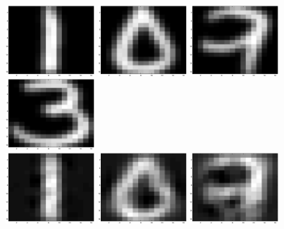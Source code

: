 \documentclass{article}
\begin{document}
\includegraphics[width=0.25\textwidth]{tes_original1.eps}\hspace{0.03\textwidth}%
\includegraphics[width=0.25\textwidth]{tes_original2.eps}\hspace{0.03\textwidth}%
\includegraphics[width=0.25\textwidth]{tes_original3.eps}\hspace{0.03\textwidth}%
\includegraphics[width=0.25\textwidth]{tes_original4.eps}\\[1em]
\includegraphics[width=0.25\textwidth]{H_tes1.eps}\hspace{0.03\textwidth}%
\includegraphics[width=0.25\textwidth]{H_tes2.eps}\hspace{0.03\textwidth}%
\includegraphics[width=0.25\textwidth]{H_tes3.eps}\hspace{0.03\textwidth}%
\end{document}

